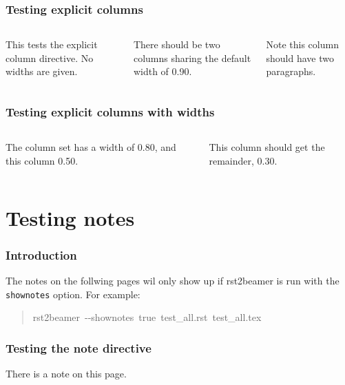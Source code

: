 \documentclass[t]{beamer}
\begin{document}
\begin{frame}[fragile]
\frametitle{Testing explicit columns}

\begin{columns}[T]

This tests the explicit column directive. No widths are given.


There should be two columns sharing the default width of 0.90.

Note this column should have two paragraphs.

\end{columns}

\end{frame}

\begin{frame}[fragile]
\frametitle{Testing explicit columns with widths}

\begin{columns}[T]

The column set has a width of 0.80, and this column 0.50.


This column should get the remainder, 0.30.

\end{columns}

\end{frame}


\section{Testing notes%
  \label{testing-notes}%
}

\begin{frame}[fragile]
\frametitle{Introduction}


The notes on the follwing pages wil only show up if rst2beamer is run with
the \texttt{shownotes} option. For example:
%
\begin{quote}{\ttfamily \raggedright \noindent
rst2beamer~-{}-shownotes~true~test\_all.rst~test\_all.tex
}
\end{quote}

\end{frame}

\begin{frame}[fragile]
\frametitle{Testing the note directive}


There is a note on this page.

\end{frame}
\end{document}
